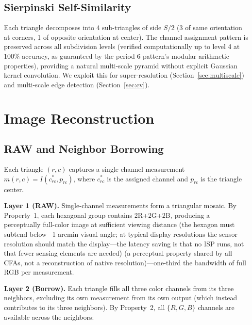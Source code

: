 \documentclass[10pt,twocolumn,letterpaper]{article}
\begin{document}
\subsection{Sierpinski Self-Similarity}

Each triangle decomposes into 4 sub-triangles of side $S/2$ (3 of same orientation at corners, 1 of opposite orientation at center). The channel assignment pattern is preserved across all subdivision levels (verified computationally up to level 4 at 100\% accuracy, as guaranteed by the period-6 pattern's modular arithmetic properties), providing a natural multi-scale pyramid without explicit Gaussian kernel convolution. We exploit this for super-resolution (Section~\ref{sec:multiscale}) and multi-scale edge detection (Section~\ref{sec:cv}).

\section{Image Reconstruction}
\label{sec:recon}

\subsection{RAW and Neighbor Borrowing}

Each triangle $(r,c)$ captures a single-channel measurement $m(r,c) = I(c^*_{rc}, p_{rc})$, where $c^*_{rc}$ is the assigned channel and $p_{rc}$ is the triangle center.

\textbf{Layer 1 (RAW).} Single-channel measurements form a triangular mosaic. By Property~1, each hexagonal group contains 2R+2G+2B, producing a perceptually full-color image at sufficient viewing distance (the hexagon must subtend below ~1 arcmin visual angle; at typical display resolutions the sensor resolution should match the display---the latency saving is that no ISP runs, not that fewer sensing elements are needed) (a perceptual property shared by all CFAs, not a reconstruction of native resolution)---one-third the bandwidth of full RGB per measurement.

\textbf{Layer 2 (Borrow).} Each triangle fills all three color channels from its three neighbors, excluding its own measurement from its own output (which instead contributes to its three neighbors). By Property~2, all $\{R,G,B\}$ channels are available across the neighbors:
\end{document}
